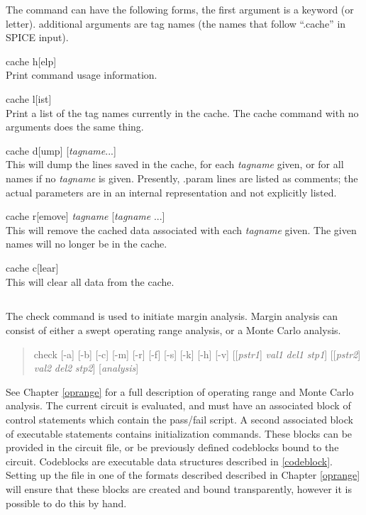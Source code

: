 The command can have the following forms, the first argument is a
keyword (or letter).  additional arguments are tag names (the names
that follow ``{\vt .cache}'' in SPICE input).

\begin{description}
\item{\vt cache h}[{\vt elp}]\\
Print command usage information.
\item{\vt cache l}[{\vt ist}]\\
Print a list of the tag names currently in the cache.  The
{\cb cache} command with no arguments does the same thing.
\item{\vt cache d}[{\vt ump}] [{\it tagname}...]\\
This will dump the lines saved in the cache, for each
{\it tagname} given, or for all names if no {\it tagname} is
given.  Presently, {\vt .param} lines are listed as comments; 
the actual parameters are in an internal representation and not
explicitly listed.
\item{\vt cache r}[{\vt emove}] {\it tagname} [{\it tagname} ...]\\
This will remove the cached data associated with each
{\it tagname} given.  The given names will no longer be in the cache.
\item{\vt cache c}[{\vt lear}]\\
This will clear all data from the cache.
\end{description}

\subsection{}
\label{checkcom}


The {\cb check} command is used to initiate margin analysis.  Margin
analysis can consist of either a swept operating range analysis, or
a Monte Carlo analysis.
\begin{quote}
{\vt check} [{\vt -a}] [{\vt -b}] [{\vt -c}] [{\vt -m}] [{\vt -r}]
  [{\vt -f}] [{\vt -s}] [{\vt -k}] [{\vt -h}] [{\vt -v}]
  [[{\it pstr1\/}] {\it val1} {\it del1} {\it stp1\/}]
  [[{\it pstr2\/}] {\it val2} {\it del2} {\it stp2\/}]
  [{\it analysis\/}]
\end{quote}
See Chapter \ref{oprange} for a full description of operating range
and Monte Carlo analysis.  The current circuit is evaluated, and must
have an associated block of control statements which contain the
pass/fail script.  A second associated block of executable statements
contains initialization commands.  These blocks can be provided in the
circuit file, or be previously defined codeblocks bound to the
circuit.  Codeblocks are executable data structures described in
\ref{codeblock}.  Setting up the file in one of the formats described
described in Chapter \ref{oprange} will ensure that these blocks are
created and bound transparently, however it is possible to do this by
hand.

